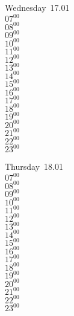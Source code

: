\documentclass[11pt, a4paper]{book}\usepackage[]{graphicx}\usepackage[]{color}
\begin{document}
\begin{weekdaybox}
  Wednesday~17.01\\
  { 
  \vfill
  $07^{00}$\\
$08^{00}$\\
$09^{00}$\\
$10^{00}$\\
$11^{00}$\\
$12^{00}$\\
$13^{00}$\\
$14^{00}$\\
$15^{00}$\\
$16^{00}$\\
$17^{00}$\\
$18^{00}$\\
$19^{00}$\\
$20^{00}$\\
$21^{00}$\\
$22^{00}$\\
$23^{00}$\\
  }
\end{weekdaybox}
\clearpage
\begin{headerbox}
\end{headerbox}
\begin{weekdaybox}
  Thursday~18.01\\
  { 
  \vfill
  $07^{00}$\\
$08^{00}$\\
$09^{00}$\\
$10^{00}$\\
$11^{00}$\\
$12^{00}$\\
$13^{00}$\\
$14^{00}$\\
$15^{00}$\\
$16^{00}$\\
$17^{00}$\\
$18^{00}$\\
$19^{00}$\\
$20^{00}$\\
$21^{00}$\\
$22^{00}$\\
$23^{00}$\\
  }
\end{weekdaybox} 
\end{document}
